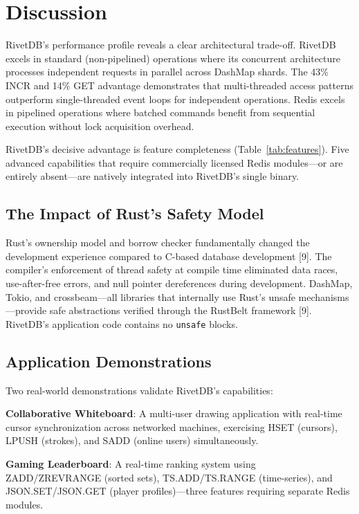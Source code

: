 \documentclass[12pt,a4paper]{report}
\begin{document}
\section{Discussion}

RivetDB's performance profile reveals a clear architectural trade-off. RivetDB excels in standard (non-pipelined) operations where its concurrent architecture processes independent requests in parallel across DashMap shards. The 43\% INCR and 14\% GET advantage demonstrates that multi-threaded access patterns outperform single-threaded event loops for independent operations. Redis excels in pipelined operations where batched commands benefit from sequential execution without lock acquisition overhead.

RivetDB's decisive advantage is feature completeness (Table~\ref{tab:features}). Five advanced capabilities that require commercially licensed Redis modules---or are entirely absent---are natively integrated into RivetDB's single binary.

\subsection{The Impact of Rust's Safety Model}

Rust's ownership model and borrow checker fundamentally changed the development experience compared to C-based database development [9]. The compiler's enforcement of thread safety at compile time eliminated data races, use-after-free errors, and null pointer dereferences during development. DashMap, Tokio, and crossbeam---all libraries that internally use Rust's unsafe mechanisms---provide safe abstractions verified through the RustBelt framework [9]. RivetDB's application code contains no \texttt{unsafe} blocks.

\subsection{Application Demonstrations}

Two real-world demonstrations validate RivetDB's capabilities:

\textbf{Collaborative Whiteboard}: A multi-user drawing application with real-time cursor synchronization across networked machines, exercising HSET (cursors), LPUSH (strokes), and SADD (online users) simultaneously.

\textbf{Gaming Leaderboard}: A real-time ranking system using ZADD/ZREVRANGE (sorted sets), TS.ADD/TS.RANGE (time-series), and JSON.SET/JSON.GET (player profiles)---three features requiring separate Redis modules.
\end{document}
